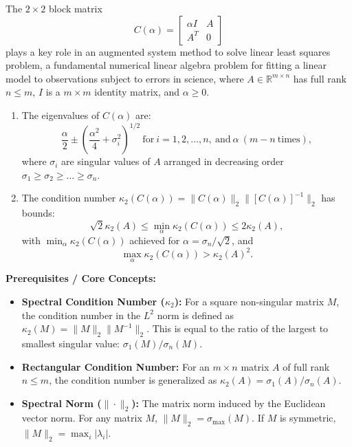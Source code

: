 \begin{exercise}
\label{applied:2015:2}
The $2\times 2$ block matrix
\[
C(\alpha)=\begin{bmatrix}\alpha I&A\\A^{T}&0\end{bmatrix}
\]
plays a key role in an augmented system method to solve linear least squares problem, a fundamental numerical linear algebra problem for fitting a linear model to observations subject to errors in science, where $A\in\mathbb{R}^{m\times n}$ has full rank $n\leq m$, $I$ is a $m\times m$ identity matrix, and $\alpha\geq 0$.

\begin{enumerate}
\item[(a)] The eigenvalues of $C(\alpha)$ are:
\[
\frac{\alpha}{2}\pm\left(\frac{\alpha^{2}}{4}+\sigma_{i}^{2}\right)^{1/2}\ \mathrm{for}\ i=1,2,\dots,n,\ \mathrm{and}\ \alpha\ (m-n\ \mathrm{times}),
\]
where $\sigma_{i}$ are singular values of $A$ arranged in decreasing order $\sigma_{1}\geq\sigma_{2}\geq\dots\geq\sigma_{n}$.
\item[(b)] The condition number $\kappa_{2}(C(\alpha))=\|C(\alpha)\|_{2} \|[C(\alpha)]^{-1}\|_{2}$ has bounds:
\[
\sqrt{2}\kappa_{2}(A)\leq\min_{\alpha}\kappa_{2}(C(\alpha))\leq 2\kappa_{2}(A),
\]
with $\min_{\alpha}\kappa_{2}(C(\alpha))$ achieved for $\alpha=\sigma_{n}/\sqrt{2}$, and
\[
\max_{\alpha}\kappa_{2}(C(\alpha))>\kappa_{2}(A)^{2}.
\]
\end{enumerate}
\end{exercise}

\textbf{Prerequisites / Core Concepts:}
\begin{itemize}
    \item \textbf{Spectral Condition Number ($\kappa_2$):} For a square non-singular matrix $M$, the condition number in the $L^2$ norm is defined as $\kappa_2(M) = \|M\|_2 \|M^{-1}\|_2$. This is equal to the ratio of the largest to smallest singular value: $\sigma_1(M) / \sigma_n(M)$.
    \item \textbf{Rectangular Condition Number:} For an $m \times n$ matrix $A$ of full rank $n \leq m$, the condition number is generalized as $\kappa_2(A) = \sigma_1(A) / \sigma_n(A)$.
    \item \textbf{Spectral Norm ($\|\cdot\|_2$):} The matrix norm induced by the Euclidean vector norm. For any matrix $M$, $\|M\|_2 = \sigma_{\max}(M)$. If $M$ is symmetric, $\|M\|_2 = \max_i |\lambda_i|$.
\end{itemize}

